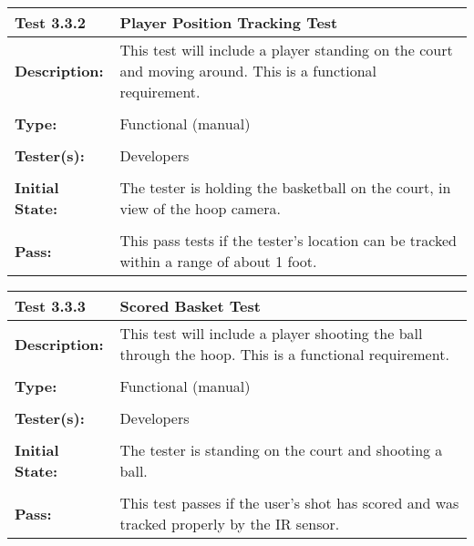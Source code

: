 \documentclass{article}
\begin{document}
\begin{tabularx}{\textwidth}{p{2cm}p{9cm}}
\toprule 
{\bf Test 3.3.2} & {\bf Player Position Tracking Test}\\
\midrule
\textbf{Description:} & This test will include a player standing on the court and moving around.  This is a functional requirement. \\[0.3\baselineskip]
                      &                     \\
\textbf{Type:} & Functional (manual)   \\[0.3\baselineskip]
                      &                     \\
\textbf{Tester(s):} & Developers \\[0.3\baselineskip]
                      &                     \\
\textbf{Initial State:} & The tester is holding the basketball on the court, in view of the hoop camera. \\[0.3\baselineskip]
                      &                     \\
\textbf{Pass:} & This pass tests if the tester's location can be tracked within a range of about 1 foot.  \\[0.3\baselineskip]
\bottomrule
\end{tabularx}

\begin{tabularx}{\textwidth}{p{2cm}p{9cm}}
\toprule 
{\bf Test 3.3.3 } & {\bf Scored Basket Test}\\
\midrule
\textbf{Description:} & This test will include a player shooting the ball through the hoop.  This is a functional requirement. \\[0.3\baselineskip]
                      &                     \\
\textbf{Type:} & Functional (manual)   \\[0.3\baselineskip]
                      &                     \\
\textbf{Tester(s):} & Developers \\[0.3\baselineskip]
                      &                     \\
\textbf{Initial State:} & The tester is standing on the court and shooting a ball. \\[0.3\baselineskip]
                      &                     \\
\textbf{Pass:} & This test passes if the user's shot has scored and was tracked properly by the IR sensor.  \\[0.3\baselineskip]
\end{tabularx}
\end{document}
